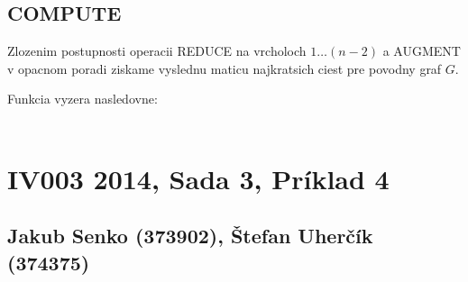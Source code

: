 \documentclass[paper=a4, fontsize=11pt]{scrartcl} %
\numberwithin{equation}{section} %
\numberwithin{figure}{section} %
\numberwithin{table}{section} %
\begin{document}
\subsection*{COMPUTE}

Zlozenim postupnosti operacii REDUCE na vrcholoch $1 \dots (n-2)$ a AUGMENT v opacnom poradi ziskame vyslednu maticu najkratsich ciest pre povodny graf $G$.

Funkcia vyzera nasledovne:\\
\ \\
\begin{algorithmic}[1]
        \EndFor
        \EndFor
        \State {}
    \EndFunction
\end{algorithmic}

\pagebreak


\section*{IV003 2014, Sada 3, Príklad 4}
\subsection*{Jakub Senko (373902), Štefan Uherčík (374375)}
\end{document}
